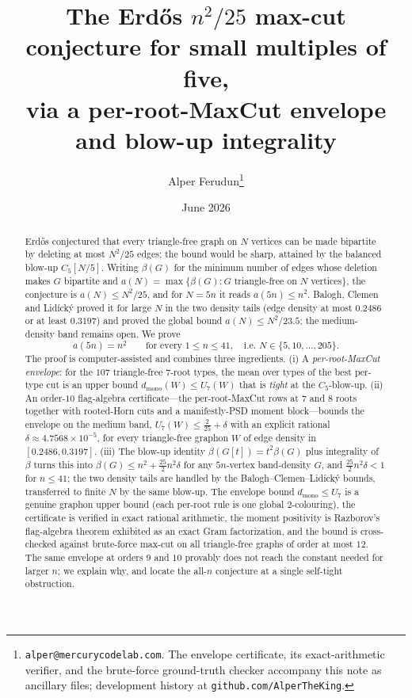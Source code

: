 \documentclass[11pt]{article}
\title{The Erd\H{o}s $n^2/25$ max-cut conjecture for small multiples of five,\\
via a per-root-MaxCut envelope and blow-up integrality}
\author{Alper Ferudun\thanks{\texttt{alper@mercurycodelab.com}. The envelope
certificate, its exact-arithmetic verifier, and the brute-force ground-truth
checker accompany this note as ancillary files; development history at
\texttt{github.com/AlperTheKing}.}}
\date{June 2026}
\theoremstyle{remark}
\newcommand{\bip}{\beta}
\newcommand{\dmono}{d_{\mathrm{mono}}}
\begin{document}
\maketitle

\begin{abstract}
Erd\H{o}s conjectured that every triangle-free graph on $N$ vertices can be made
bipartite by deleting at most $N^2/25$ edges; the bound would be sharp, attained
by the balanced blow-up $C_5[N/5]$. Writing $\bip(G)$ for the minimum number of
edges whose deletion makes $G$ bipartite and $a(N)=\max\{\bip(G):G$ triangle-free
on $N$ vertices$\}$, the conjecture is $a(N)\le N^2/25$, and for $N=5n$ it reads
$a(5n)\le n^2$. Balogh, Clemen and Lid\'ick\'y proved it for large $N$ in the two
density tails (edge density at most $0.2486$ or at least $0.3197$) and proved the
global bound $a(N)\le N^2/23.5$; the medium-density band remains open. We prove
\[
a(5n)=n^2\qquad\text{for every }1\le n\le 41,\quad\text{i.e. } N\in\{5,10,\dots,205\}.
\]
The proof is computer-assisted and combines three ingredients. (i) A
\emph{per-root-MaxCut envelope}: for the $107$ triangle-free $7$-root types, the
mean over types of the best per-type cut is an upper bound
$\dmono(W)\le U_7(W)$ that is \emph{tight} at the $C_5$-blow-up. (ii) An order-$10$
flag-algebra certificate---the per-root-MaxCut rows at $7$ and $8$ roots together
with rooted-Horn cuts and a manifestly-PSD moment block---bounds the envelope on
the medium band, $U_7(W)\le \tfrac{2}{25}+\delta$ with an explicit rational
$\delta\approx 4.7568\times10^{-5}$, for every triangle-free graphon $W$ of edge
density in $[0.2486,0.3197]$. (iii) The blow-up identity $\bip(G[t])=t^2\bip(G)$ plus
integrality of $\bip$ turns this into $\bip(G)\le n^2+\tfrac{25}{2}n^2\delta$ for
any $5n$-vertex band-density $G$, and $\tfrac{25}{2}n^2\delta<1$ for $n\le 41$;
the two density tails are handled by the Balogh--Clemen--Lid\'ick\'y bounds,
transferred to finite $N$ by the same blow-up. The envelope bound $\dmono\le U_7$
is a genuine graphon upper bound (each per-root rule is one global $2$-colouring),
the certificate is verified in exact rational arithmetic, the moment positivity is
Razborov's flag-algebra theorem exhibited as an exact Gram factorization, and the
bound is cross-checked against brute-force max-cut on all triangle-free graphs of
order at most $12$. The same envelope at orders $9$ and $10$ provably does not
reach the constant needed for larger $n$; we explain why, and locate the all-$n$
conjecture at a single self-tight obstruction.
\end{abstract}
\end{document}
